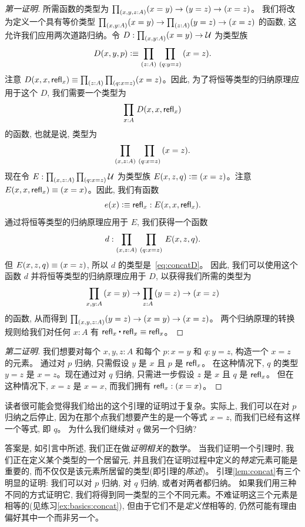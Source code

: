 \begin{proof}[第一证明]
  所需函数的类型为 $\prd{x,y,z:A} (x= y) \to   (y= z)\to (x=  z)$。
  我们将改为定义一个具有等价类型 $\prd{x,y:A} (x= y) \to \prd{z:A} (y= z)\to (x=  z)$ 的函数, 
  这允许我们应用两次道路归纳。令 $D:\prd{x,y:A} (x=y) \to \type$ 为类型族
  \begin{equation*}
    D(x,y,p)\defeq \prd{z:A}{q:y=z} (x=z).
  \end{equation*}
  注意 $D(x,x,\refl x) \jdeq \prd{z:A}{q:x=z} (x=z)$。因此, 为了将恒等类型的归纳原理应用于这个 $D$, 我们需要一个类型为
  \begin{equation}\label{eq:concatD}
    \prd{x:A} D(x,x,\refl{x})
  \end{equation}
  的函数, 也就是说, 类型为
  \[ \prd{x,z:A}{q:x=z} (x=z). \]
  现在令 $E:\prd{x,z:A}{q:x=z}\type$ 为类型族 $E(x,z,q)\vcentcolon\equiv (x=z)$。注意 $E(x,x,\mathsf{refl}_{x}) \equiv (x=x)$。因此, 我们有函数
  \begin{equation*}
    e(x) \vcentcolon\equiv \mathsf{refl}_{x} : E(x,x,\mathsf{refl}_{x}).
  \end{equation*}
  通过将恒等类型的归纳原理应用于 $E$, 我们获得一个函数
  \begin{equation*}
    d : \prd{x,z:A}{q:x=z} E(x,z,q).
  \end{equation*}
  但 $E(x,z,q)\equiv (x=z)$, 所以 $d$ 的类型是~\eqref{eq:concatD}。
  因此, 我们可以使用这个函数 $d$ 并将恒等类型的归纳原理应用于 $D$, 以获得我们所需的类型为
  \begin{equation*}
    \prd{x,y:A} (x= y) \to \prd{z:A} (y= z)\to (x=  z)
  \end{equation*}
  的函数, 从而得到 $\prd{x,y,z:A} (y=z) \to (x=y) \to (x=z)$。
  两个归纳原理的转换规则给我们对任何 $x:A$ 有 $\refl{x}\ct \refl{x}\jdeq \refl{x}$。
\end{proof}

\begin{proof}[第二证明]
  我们想要对每个 $x,y,z:A$ 和每个 $p:x=y$ 和 $q:y=z$, 构造一个 $x=z$ 的元素。
  通过对 $p$ 归纳, 只需假设 $y$ 是 $x$ 且 $p$ 是 $\mathsf{refl}_{x}$。
  在这种情况下, $q$ 的类型 $y=z$ 是 $x=z$。现在通过对 $q$ 归纳, 只需进一步假设 $z$ 是 $x$ 且 $q$ 是 $\mathsf{refl}_{x}$。
  但在这种情况下, $x=z$ 是 $x=x$, 而我们拥有 $\mathsf{refl}_{x}:(x=x)$。
\end{proof}

读者很可能会觉得我们给出的这个引理的证明过于复杂。实际上, 我们可以在对 $p$ 归纳之后停止, 因为在那个点我们想要产生的是一个等式 $x=z$, 而我们已经有这样一个等式, 即 $q$。
为什么我们继续对 $q$ 做另一个归纳?

答案是, 如引言中所述, 我们正在做\emph{证明相关}的数学。
%
当我们证明一个引理时, 我们正在定义某个类型的一个居留元, 并且我们在证明过程中定义的\emph{特定}元素可能是重要的, 而不仅仅是该元素所居留的类型(即引理的\emph{陈述})。
引理\ref{lem:concat}有三个明显的证明: 我们可以对 $p$ 归纳, 对 $q$ 归纳, 或者对两者都归纳。
如果我们用三种不同的方式证明它, 我们将得到同一类型的三个不同元素。不难证明这三个元素是相等的(见练习\ref{ex:basics:concat}), 
但由于它们不是\emph{定义性}相等的, 仍然可能有理由偏好其中一个而非另一个。

